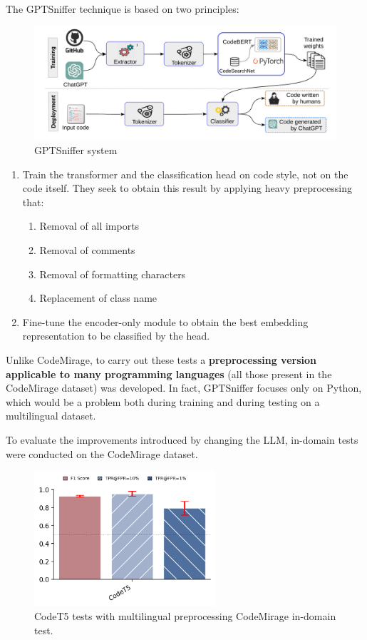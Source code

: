 The GPTSniffer technique is based on two principles:
\begin{figure}[H]
    \centering
    \includegraphics[width=1\textwidth]{img/gptsniffer/system components.png}
    \caption{GPTSniffer system}
    \label{fig:GPTSniffer system}
\end{figure}
\begin{enumerate}
    \item Train the transformer and the classification head on code style, 
    not on the code itself. 
    They seek to obtain this result by applying heavy preprocessing that:   
    \begin{enumerate}
        \item Removal of all imports
        \item Removal of comments
        \item Removal of formatting characters
        \item Replacement of class name
    \end{enumerate}
    \item Fine-tune the encoder-only module to obtain the best embedding 
    representation to be classified by the head.
\end{enumerate}

Unlike CodeMirage, to carry out these tests a \textbf{preprocessing 
version applicable to many programming languages} (all those present in 
the CodeMirage dataset) was developed. In fact, GPTSniffer focuses only on 
Python, which would be a problem both during training and during testing on 
a multilingual dataset.

To evaluate the improvements introduced by changing the LLM, in-domain tests 
were conducted on the CodeMirage dataset.
\begin{figure}[H]
    \centering
    \includegraphics[width=0.6\textwidth]{img/c417a8ce5c9471cc3376985dcd3c92917482dbce03e702dccf49c684.png}
    \caption{CodeT5 tests with multilingual preprocessing CodeMirage in-domain test.}
    \label{fig:CodeT5 tests with multilingual preprocessing}
\end{figure}

